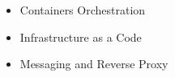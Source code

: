 
\divider

\begin{itemize}
    \item Containers Orchestration
\end{itemize}


\divider

\begin{itemize}
    \item Infrastructure as a Code
\end{itemize}


\divider

\begin{itemize}
    \item Messaging and Reverse Proxy 
\end{itemize}


\divider


\bigskip
\bigskip
\bigskip
\bigskip
\bigskip
\bigskip


\clearpage
